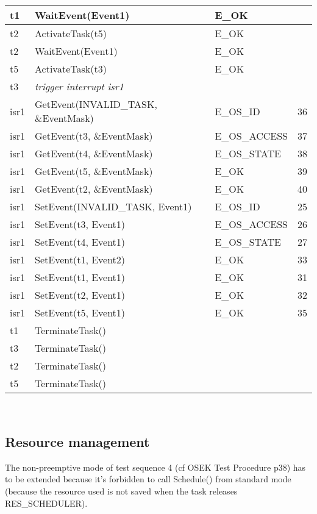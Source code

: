 \documentclass[10pt]{article}
\newlength{\Li}\settowidth{\Li}{Running}
\newlength{\Lii}\setlength{\Lii}{7cm}
\newlength{\Liiii}\setlength{\Liiii}{0.9cm}
\newlength{\Liii}\setlength{\Liii}{\textwidth} \addtolength{\Liii}{-\Li} \addtolength{\Liii}{-\Lii} \addtolength{\Liii}{-\Liiii}
\begin{document}
	\begin{supertabular}{|p{\Li}|p{\Lii}|p{\Liii}|p{\Liiii}|} \hline 
	t1	& WaitEvent(Event1) 						& E\_OK	 			& \\ \hline 
	t2	& ActivateTask(t5)							& E\_OK				& \\ \hline 
	t2	& WaitEvent(Event1) 						& E\_OK	 			& \\ \hline 
	t5	& ActivateTask(t3)							& E\_OK				& \\ \hline 
	t3 	& \textit{trigger interrupt isr1}					&  					& \\ \hline
	isr1	& GetEvent(INVALID\_TASK, \&EventMask) 		& E\_OS\_ID			& 36 \\ \hline 
	isr1 	& GetEvent(t3, \&EventMask)					& E\_OS\_ACCESS 		& 37 \\ \hline 
	isr1	& GetEvent(t4, \&EventMask) 					& E\_OS\_STATE 		& 38 \\ \hline 
	isr1 	& GetEvent(t5, \&EventMask)					& E\_OK 				& 39 \\ \hline 
	isr1	& GetEvent(t2, \&EventMask) 					& E\_OK		 		& 40 \\ \hline 
	isr1	& SetEvent(INVALID\_TASK, Event1) 			& E\_OS\_ID	 		& 25 \\ \hline 
	isr1	& SetEvent(t3, Event1) 						& E\_OS\_ACCESS 		& 26 \\ \hline 
	isr1	& SetEvent(t4, Event1) 						& E\_OS\_STATE		& 27 \\ \hline 
	isr1	& SetEvent(t1, Event2) 						& E\_OK		 		& 33 \\ \hline 
	isr1	& SetEvent(t1, Event1) 						& E\_OK		 		& 31 \\ \hline 
	isr1	& SetEvent(t2, Event1) 						& E\_OK		 		& 32 \\ \hline 
	isr1	& SetEvent(t5, Event1) 						& E\_OK		 		& 35 \\ \hline 
	t1	& TerminateTask()							&					&  \\ \hline
	t3	& TerminateTask()							&					&  \\ \hline
	t2	& TerminateTask()							&					&  \\ \hline
	t5	& TerminateTask()							&					&  \\ \hline
	\end{supertabular} \\

\subsection{Resource management}
	The non-preemptive mode of test sequence 4 (cf OSEK Test Procedure \cite{OSEK_Test_Procedure_20} p38) has to be extended because it's forbidden to call Schedule() from standard mode (because the resource used is not saved when the task releases RES\_SCHEDULER). \\
	
\end{document}
